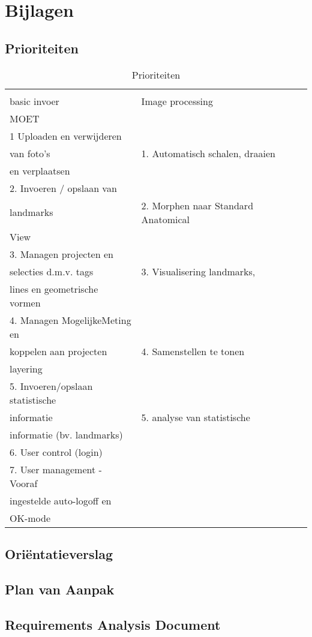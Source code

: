 \section{Bijlagen}
\label{Bijlagen}
\subsection{Prioriteiten}
\begin{table*}[htbp]
	\caption{Prioriteiten}
	\label{tab:Prioriteiten}
	\begin{tabular}{llll}
		\large{Database systeem en \\ \large{basic invoer} & \large{Image processing} \\
		\large{MOET} & & & \\
		1 Uploaden en verwijderen \\van foto's & 1. Automatisch schalen, draaien \\en verplaatsen\\
		2. Invoeren / opslaan van \\landmarks & 2. Morphen naar Standard Anatomical \\View \\
		3. Managen projecten en \\selecties d.m.v. tags & 3. Visualisering landmarks, \\lines en geometrische vormen \\
		4. Managen MogelijkeMeting en \\koppelen aan projecten & 4. Samenstellen te tonen \\layering \\
		5. Invoeren/opslaan statistische \\informatie & 5. analyse van statistische \\informatie (bv. landmarks) \\
		6. User control (login) & \\
		7. User management - Vooraf \\ingestelde auto-logoff en \\OK-mode & \\
	\end{tabular}
\end{table*}

\subsection{Ori\"{e}ntatieverslag}

\subsection{Plan van Aanpak}

\subsection{Requirements Analysis Document}
